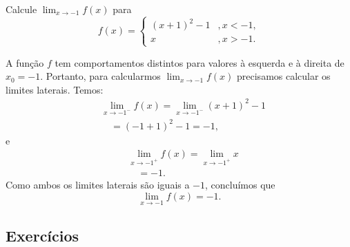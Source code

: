 \begin{exeresol}
  Calcule $\lim_{x\to -1} f(x)$ para
  \begin{equation}
    f(x) = \left\{
      \begin{array}{ll}
        (x+1)^2-1 &, x<-1,\\
        x &, x>-1.
      \end{array}
\right.
  \end{equation}
\end{exeresol}
\begin{resol}
  A função $f$ tem comportamentos distintos para valores à esquerda e à direita de $x_0=-1$. Portanto, para calcularmos $\lim_{x\to -1} f(x)$ precisamos calcular os limites laterais. Temos:
  \begin{align}
    & \lim_{x\to -1^-} f(x) = \lim_{x\to -1^-} (x+1)^2-1 \\
    & \text{}\quad = (-1+1)^2-1 = -1,
  \end{align}
  e
  \begin{align}
    & \lim_{x\to -1^+} f(x) = \lim_{x\to -1^+} x \\
    & \text{}\quad = -1.
  \end{align}
  Como ambos os limites laterais são iguais a $-1$, concluímos que
  \begin{equation}
    \lim_{x\to -1} f(x) = -1.
  \end{equation}
\end{resol}

\subsection{Exercícios}

